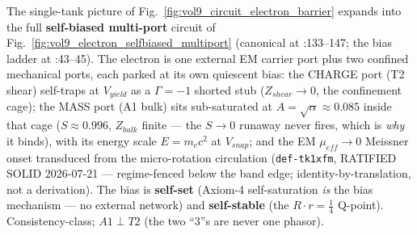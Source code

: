 The single-tank picture of Fig.~\ref{fig:vol9_circuit_electron_barrier} expands into the full \textbf{self-biased multi-port} circuit of Fig.~\ref{fig:vol9_electron_selfbiased_multiport} (canonical at :133--147; the bias ladder at :43--45). The electron is one external EM carrier port plus two confined mechanical ports, each parked at its own quiescent bias: the CHARGE port (T2 shear) self-traps at $V_{yield}$ as a $\Gamma=-1$\gammaundeclared{} shorted stub ($Z_{shear}\to0$, the confinement cage); the MASS port (A1 bulk) sits sub-saturated at $A=\sqrt{\alpha}\approx0.085$ inside that cage ($S\approx0.996$, $Z_{bulk}$ finite --- the $S\to0$ runaway never fires, which is \emph{why} it binds), with its energy scale $E=m_ec^2$ at $V_{snap}$; and the EM $\mu_{eff}\to0$ Meissner onset transduced from the micro-rotation circulation (\texttt{def-tk1xfm}, RATIFIED SOLID 2026-07-21 --- regime-fenced below the band edge; identity-by-translation, not a derivation). The bias is \textbf{self-set} (Axiom-4 self-saturation \emph{is} the bias mechanism --- no external network) and \textbf{self-stable} (the $R\!\cdot\!r=\tfrac14$ Q-point). Consistency-class; $A1\perp T2$ (the two ``3''s are never one phasor).



